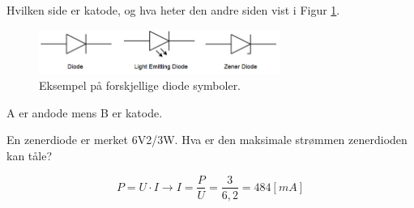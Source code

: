 \begin{question}[name=Oppgave, topic=zenerdioder]
Hvilken side er katode, og hva heter den andre siden vist i Figur \ref{fig:zenBasic}.

	\begin{figure}[H]
	\centering
	\includegraphics[width=0.7\textwidth]{diode/figurer/oppgave1.png}
	\caption{Eksempel på forskjellige diode symboler.}
	\label{fig:zenBasic}
	\end{figure}

\end{question}


\vspace{0.5cm} %

\begin{solution}[name=Løsningsforslag oppgave]
A er andode mens B er katode.

\end{solution}

\begin{question}[name=Oppgave, topic=zenerdioder]
En zenerdiode er merket 6V2/3W. Hva er den maksimale strømmen zenerdioden kan tåle?
\end{question}

\vspace{0.5cm} %

\begin{solution}[name=Løsningsforslag oppgave]
\[P=U\cdot I\rightarrow I=\frac{P}{U}=\frac{3}{6,2}=484 [mA]\]
	
\end{solution}




